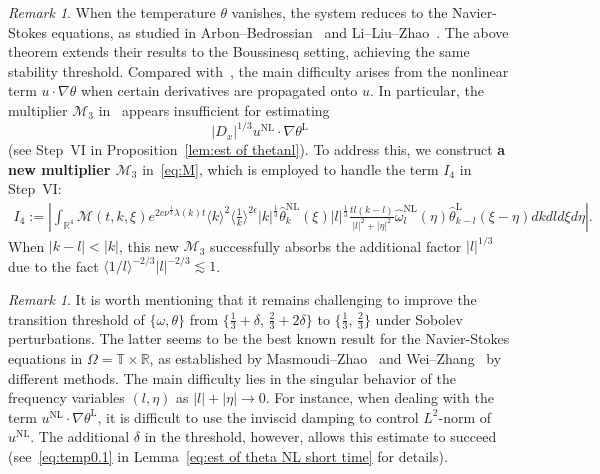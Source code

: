 \documentclass[reqno, 12pt]{amsart} %
\theoremstyle{plain} %
\theoremstyle{definition}
\theoremstyle{remark}
\newtheorem{Rem}[Thm]{Remark}
\numberwithin{equation}{section} %
\begin{document}
\begin{Rem} 
		When the temperature $\theta$ vanishes, the system reduces to the Navier-Stokes equations, as studied in Arbon--Bedrossian~\cite{AB2024} and Li--Liu--Zhao~\cite{LLZ2025}. The above theorem extends their results to the Boussinesq setting, achieving the same stability threshold. Compared with~\cite{LLZ2025}, the main difficulty arises from the nonlinear term $u\cdot\nabla \theta$ when certain derivatives are propagated onto $u$. In particular, the multiplier $\mathcal{M}_3$ in~\cite{LLZ2025} appears insufficient for estimating 
		\[
		|D_x|^{1/3} u^{\mathrm{NL}} \cdot \nabla \theta^{\mathrm{L}}
		\]
		(see Step~VI in Proposition~\ref{lem:est of thetanl}). To address this, we construct {\bf a new multiplier $\mathcal{M}_3$} in~\eqref{eq:M}, which is employed to handle the term $I_4$ in Step~VI:
		$$
		\begin{gathered}
			I_4 :=\left|\int_{\mathbb{R}^4} \mathcal{M}(t, k, \xi) e^{2 c \nu^{\frac{1}{3}} \lambda(k) t}\langle k\rangle^2\langle\frac{1}{k}\rangle^{2 \epsilon} |k|^\frac13\hat{\theta}_k^{\mathrm{NL}}(\xi) |l|^\frac13  \frac{t l(k-l)}{|l|^2+|\eta|^2} \hat{\omega}_l^{\mathrm{NL}}(\eta) \hat{\theta}_{k-l}^{\mathrm{L}}(\xi-\eta) d k d l d \xi d \eta\right| .
		\end{gathered}
		$$ 
		When $|k-l| < |k|$, this new $\mathcal{M}_3$ successfully absorbs the additional factor $|l|^{1/3}$ due to the fact $\langle 1/l \rangle^{-2/3} {|l|^{-2/3}}  \lesssim 1$.
	\end{Rem}

    \begin{Rem}
		It is worth mentioning that it remains challenging to improve the transition threshold of $\{\omega,\theta\}$ from $\{\frac{1}{3}+\delta,\, \frac{2}{3}+2\delta\}$ to $\{\frac{1}{3},\, \frac{2}{3}\}$ under Sobolev perturbations. The latter seems to be the best known result for the Navier-Stokes equations in $\Omega = \mathbb{T} \times \mathbb{R}$, as established by Masmoudi--Zhao~\cite{MZ2022} and Wei--Zhang~\cite{WZ2023} by different methods. The main difficulty lies in the singular behavior of the frequency variables $(l,\eta)$ as $|l| + |\eta| \to 0$. For instance, when dealing with the term $u^{\mathrm{NL}} \cdot \nabla \theta^{\mathrm{L}}$, it is difficult to use the inviscid damping to control $L^2$-norm of $u^{\mathrm{NL}}$. The additional $\delta$ in the threshold, however, allows this estimate to succeed (see~\eqref{eq:temp0.1} in Lemma~\ref{eq:est of theta NL short time} for details).
	\end{Rem}
	
\end{document}
